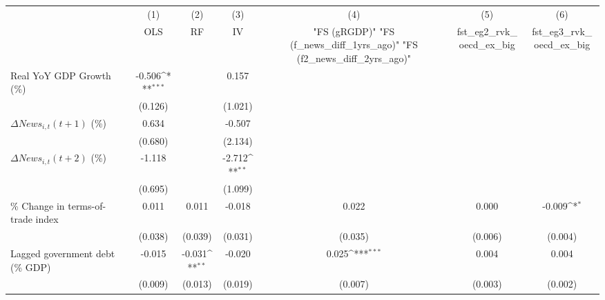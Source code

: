 {
\def\sym#1{\ifmmode^{#1}\else\(^{#1}\)\fi}
\begin{tabular}{l*{6}{c}}
\toprule
                    &\multicolumn{1}{c}{(1)}&\multicolumn{1}{c}{(2)}&\multicolumn{1}{c}{(3)}&\multicolumn{1}{c}{(4)}&\multicolumn{1}{c}{(5)}&\multicolumn{1}{c}{(6)}\\
                    &\multicolumn{1}{c}{OLS}&\multicolumn{1}{c}{RF}&\multicolumn{1}{c}{IV}&\multicolumn{1}{c}{ "FS (gRGDP)"  "FS (f_news_diff_1yrs_ago)"  "FS (f2_news_diff_2yrs_ago)" }&\multicolumn{1}{c}{fst_eg2_rvk_oecd_ex_big}&\multicolumn{1}{c}{fst_eg3_rvk_oecd_ex_big}\\
\midrule
Real YoY GDP Growth (\%)&      -0.506\sym{***}&                     &       0.157         &                     &                     &                     \\
                    &     (0.126)         &                     &     (1.021)         &                     &                     &                     \\
\addlinespace
$ \Delta News_{i,t}(t+1)$ (\%)&       0.634         &                     &      -0.507         &                     &                     &                     \\
                    &     (0.680)         &                     &     (2.134)         &                     &                     &                     \\
\addlinespace
$ \Delta News_{i,t}(t+2)$ (\%)&      -1.118         &                     &      -2.712\sym{**} &                     &                     &                     \\
                    &     (0.695)         &                     &     (1.099)         &                     &                     &                     \\
\addlinespace
\% Change in terms-of-trade index&       0.011         &       0.011         &      -0.018         &       0.022         &       0.000         &      -0.009\sym{*}  \\
                    &     (0.038)         &     (0.039)         &     (0.031)         &     (0.035)         &     (0.006)         &     (0.004)         \\
\addlinespace
Lagged government debt (\% GDP)&      -0.015         &      -0.031\sym{**} &      -0.020         &       0.025\sym{***}&       0.004         &       0.004         \\
                    &     (0.009)         &     (0.013)         &     (0.019)         &     (0.007)         &     (0.003)         &     (0.002)         \\

\end{tabular}}
